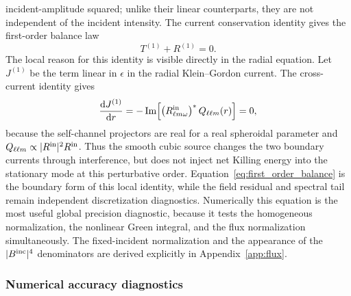 \documentclass[aps,prd,twocolumn,10pt,nofootinbib,superscriptaddress,floatfix]{revtex4-2}
\newcommand{\dd}{\mathrm{d}}
\newcommand{\Bin}{B^{\rm inc}}
\begin{document}
incident-amplitude squared; unlike their linear counterparts, they are not
independent of the incident intensity.
The current conservation identity gives the first-order balance law
\begin{equation}
T^{(1)}+R^{(1)}=0.
\label{eq:first_order_balance}
\end{equation}
The local reason for this identity is visible directly in the radial equation.
Let $J^{(1)}$ be the term linear in $\epsilon$ in the radial Klein--Gordon
current.  The cross-current identity gives
\begin{equation}
\frac{\dd J^{(1)}}{\dd r}
=-\operatorname{Im}\!\left[
\left(R^{\rm in}_{\ell m\omega}\right)^*Q_{\ell\ell m}(r)
\right]=0,
\label{eq:first_order_local_current}
\end{equation}
because the self-channel projectors are real for a real spheroidal parameter
and $Q_{\ell\ell m}\propto|R^{\rm in}|^2R^{\rm in}$.  Thus the smooth cubic
source changes the two boundary currents through interference, but does not
inject net Killing energy into the stationary mode at this perturbative order.
Equation~\eqref{eq:first_order_balance} is the boundary form of this local
identity, while the field residual and spectral tail remain independent
discretization diagnostics.
Numerically this equation is the most useful global precision diagnostic,
because it tests the homogeneous normalization, the nonlinear Green integral,
and the flux normalization simultaneously.  The fixed-incident normalization
and the appearance of the $|\Bin|^4$ denominators are derived explicitly in
Appendix~\ref{app:flux}.

\subsubsection{Numerical accuracy diagnostics}
\end{document}
